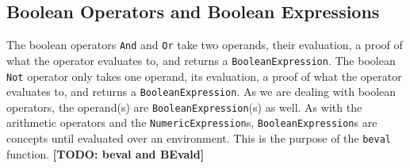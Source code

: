     \subsection{Boolean Operators and Boolean Expressions}
        The boolean operators \texttt{And} and \texttt{Or} take two operands, their evaluation, a proof of what the operator evaluates to, and returns a \texttt{BooleanExpression}. The boolean \texttt{Not} operator only takes one operand, its evaluation, a proof of what the operator evaluates to, and returns a \texttt{BooleanExpression}. As we are dealing with boolean operators, the operand(s) are \texttt{BooleanExpression}(s) as well.
        As with the arithmetic operators and the \texttt{NumericExpression}s, \texttt{BooleanExpression}s are concepts until evaluated over an environment. This is the purpose of the \texttt{beval} function. \textbf{[TODO: beval and BEvald]}

